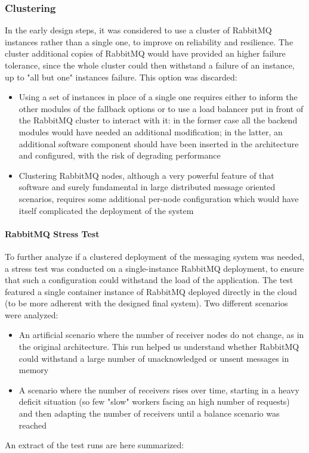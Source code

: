   \subsubsection{Clustering}
  \label{ssse:rmqclustering}
    In the early design steps, it was considered to use a cluster of RabbitMQ instances rather than a single one, to improve on reliability and resilience. The cluster additional copies of RabbitMQ would have provided an higher failure tolerance, since the whole cluster could then withstand a failure of an instance, up to "all but one" instances failure. This option was discarded:
    \begin{itemize}
      \item Using a set of instances in place of a single one requires either to inform the other modules of the fallback options or to use a load balancer put in front of the RabbitMQ cluster to interact with it: in the former case all the backend modules would have needed an additional modification; in the latter, an additional software component should have been inserted in the architecture and configured, with the risk of degrading performance
      \item Clustering RabbitMQ nodes, although a very powerful feature of that software and surely fundamental in large distributed message oriented scenarios, requires some additional per-node configuration which would have itself complicated the deployment of the system
    \end{itemize}
    
    \paragraph{RabbitMQ Stress Test}
      To further analyze if a clustered deployment of the messaging system was needed, a stress test was conducted on a single-instance RabbitMQ deployment, to ensure that such a configuration could withstand the load of the application. The test featured a single container instance of RabbitMQ deployed directly in the cloud (to be more adherent with the designed final system). Two different scenarios were analyzed:
      \begin{itemize}
        \item An artificial scenario where the number of receiver nodes do not change, as in the original architecture. This run helped us understand whether RabbitMQ could withstand a large number of unacknowledged or unsent messages in memory
        \item A scenario where the number of receivers rises over time, starting in a heavy deficit situation (so few "slow" workers facing an high number of requests) and then adapting the number of receivers until a balance scenario was reached
      \end{itemize}
      An extract of the test runs are here summarized:

